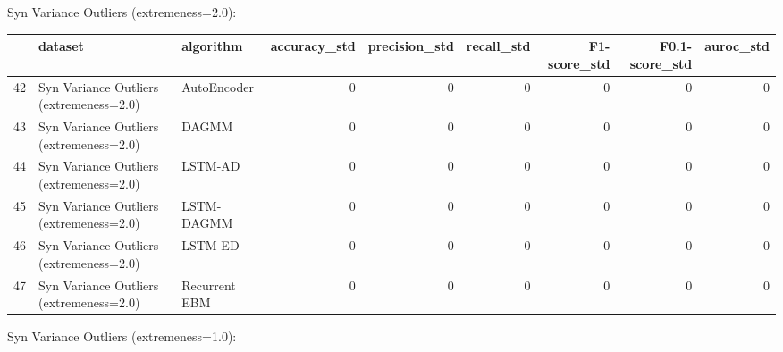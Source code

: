 Syn Variance Outliers (extremeness=2.0):

\begin{tabular}{rllrrrrrr}
\hline
    & dataset                                 & algorithm     &   accuracy\_std &   precision\_std &   recall\_std &   F1-score\_std &   F0.1-score\_std &   auroc\_std \\
\hline
 42 & Syn Variance Outliers (extremeness=2.0) & AutoEncoder   &              0 &               0 &            0 &              0 &                0 &           0 \\
 43 & Syn Variance Outliers (extremeness=2.0) & DAGMM         &              0 &               0 &            0 &              0 &                0 &           0 \\
 44 & Syn Variance Outliers (extremeness=2.0) & LSTM-AD       &              0 &               0 &            0 &              0 &                0 &           0 \\
 45 & Syn Variance Outliers (extremeness=2.0) & LSTM-DAGMM    &              0 &               0 &            0 &              0 &                0 &           0 \\
 46 & Syn Variance Outliers (extremeness=2.0) & LSTM-ED       &              0 &               0 &            0 &              0 &                0 &           0 \\
 47 & Syn Variance Outliers (extremeness=2.0) & Recurrent EBM &              0 &               0 &            0 &              0 &                0 &           0 \\
\hline
\end{tabular}

Syn Variance Outliers (extremeness=1.0):

